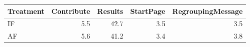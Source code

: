 \begin{tabular}{lrrrr}
  \toprule
  Treatment & Contribute & Results & StartPage & RegroupingMessage \\ 
  \midrule
  IF & 5.5 & 42.7 & 3.5 & 3.5 \\ 
  AF & 5.6 & 41.2 & 3.4 & 3.8 \\ 
  \bottomrule
\end{tabular}
